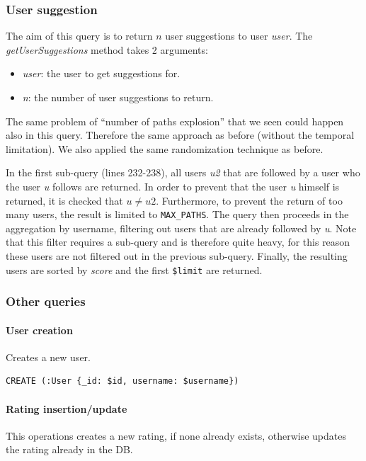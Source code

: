 \documentclass[11pt]{article}
\begin{document}
\subsubsection{User suggestion}
The aim of this query is to return $n$ user suggestions to user \emph{user}.
The \emph{getUserSuggestions} method takes 2 arguments:

\begin{itemize}
    \item \emph{user}: the user to get suggestions for.
    \item \emph{n}: the number of user suggestions to return.
\end{itemize}

The same problem of ``number of paths explosion'' that we seen could happen also in this query. Therefore the same approach as before (without the temporal limitation). We also applied the same randomization technique as before.



In the first sub-query (lines 232-238), all users \emph{u2} that are followed by
a user who the user \emph{u} follows are returned. In order to prevent that the 
user \emph{u} himself is returned, it is checked that $u \ne u2$. Furthermore,
to prevent the return of too many users, the result is limited to 
\texttt{MAX\_PATHS}.
The query then proceeds in the aggregation by username, filtering out users that
are already followed by \emph{u}. Note that this filter requires a sub-query 
and is therefore quite heavy, for this reason these users are not filtered out 
in the previous sub-query. Finally, the resulting users are sorted by 
\emph{score} and the first \texttt{\$limit} are returned. 

\subsubsection{Other queries}

\paragraph{User creation} Creates a new user.

\begin{lstlisting}[language=Cypher]
CREATE (:User {_id: $id, username: $username})
\end{lstlisting}

\paragraph{Rating insertion/update} This operations creates a new rating, if none already exists, otherwise updates the rating already in the DB.
\end{document}
